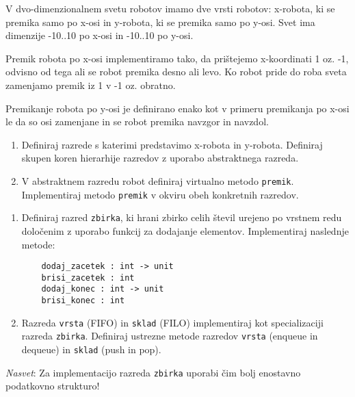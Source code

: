 \begin{ex}
  V dvo-dimenzionalnem svetu robotov imamo dve vrsti robotov:
  x-robota, ki se premika samo po x-osi in y-robota, ki se premika
  samo po y-osi. Svet ima dimenzije -10..10 po x-osi in -10..10 po
  y-osi.

  Premik robota po x-osi implementiramo tako, da pri\v stejemo
  x-koordinati 1 oz. -1, odvisno od tega ali se robot premika desno
  ali levo. Ko robot pride do roba sveta zamenjamo premik iz 1 v -1
  oz. obratno.

  Premikanje robota po y-osi je definirano enako kot v primeru
  premikanja po x-osi le da so osi zamenjane in se robot premika
  navzgor in navzdol.

  \begin{enumerate}
  \item Definiraj razrede s katerimi predstavimo x-robota in
    y-robota. Definiraj skupen koren hierarhije razredov z uporabo
    abstraktnega razreda.

  \item V abstraktnem razredu robot definiraj virtualno metodo
    \texttt{premik}. Implementiraj metodo \texttt{premik} v
    okviru obeh konkretnih razredov.
  \end{enumerate}


\end{ex} 
\begin{ex}
  \begin{enumerate}
  \item Definiraj razred \texttt{zbirka}, ki hrani zbirko celih \v
    stevil urejeno po vrstnem redu dolo\v cenim z uporabo funkcij za
    dodajanje elementov. Implementiraj naslednje metode:

    \begin{verbatim}
    dodaj_zacetek : int -> unit
    brisi_zacetek : int 
    dodaj_konec : int -> unit
    brisi_konec : int  
    \end{verbatim}

  \item Razreda \texttt{vrsta} (FIFO) in \texttt{sklad} (FILO)
    implementiraj kot specializaciji razreda
    \texttt{zbirka}. Definiraj ustrezne metode razredov \texttt{vrsta}
    (enqueue in dequeue) in \texttt{sklad} (push in pop).
  \end{enumerate}

  \emph{Nasvet}: Za implementacijo razreda \texttt{zbirka} uporabi \v
  cim bolj enostavno podatkovno strukturo!


\end{ex} 
